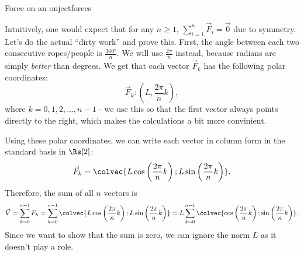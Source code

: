 \begin{example}{Force on an onject}{forces}
  \newcommand{\nrope}[2]{
    \pgfmathsetmacro{\L}{1.5}
    \pgfmathsetmacro{\n}{#1}
    \pgfmathsetmacro{\m}{\n-1}
    \pgfmathsetmacro{\degs}{int(360/\n)}
    \node[person={black}{}, minimum size=5pt] (\n-O) at (0,0) {};
    \foreach \k in {0,...,\m}{
      \node[person={#2}{}] (\n-\k) at ({\L*cos(\degs*\k)},{\L*sin(\degs*\k)}) {};
      \draw[rope] (\n-\k) -- (O);
      \draw[ropeb] (\n-\k) -- (O);
    }
    \node at (0,{\L*1.5}) {\underline{$n=\n$}};
    \draw[arcnode={-8*\L}{$\ang{\degs}$}] ({\L/2},0) arc (0:{\degs}:{\L/2});
    \draw[thick, dashed] ({\L/2},0) arc (0:{\degs}:{\L/2});
  }
  \begin{center}
    \hspace{1.5cm}

    \vspace{1em}
    \hspace{1.5cm}
  \end{center}

  Intuitively, one would expect that for any $n\geq1$, $\sum\limits_{i=1}^{n}\vec{F}_{i}=\vec{0}$ due to symmetry. Let's do the actual ``dirty work'' and prove this. First, the angle between each two consecutive ropes/people is $\frac{\ang{360}}{n}$. We will use $\frac{2\pi}{n}$ instead, because radians are simply \textit{better} than degrees. We get that each vector $\vec{F}_{k}$ has the following polar coordinates:
  \[
    \vec{F}_{k}: \left(L,\frac{2\pi}{n}k\right),
  \]
  where $k=0,1,2,\dots,n-1$ - we use this so that the first vector always points directly to the right, which makes the calculations a bit more convinient.

  Using these polar coordinates, we can write each vector in column form in the standard basis in $\Rs[2]$:
  \[
    \vec{F}_{k} = \colvec{L\cos\left(\frac{2\pi}{n}k\right);L\sin\left(\frac{2\pi}{n}k\right)}.
  \]
  Therefore, the sum of all $n$ vectors is
  \[
    \vec{V} = \sum\limits_{k=0}^{n-1}F_{k} = \sum\limits_{k=0}^{n-1}\colvec{L\cos\left(\frac{2\pi}{n}k\right);L\sin\left(\frac{2\pi}{n}k\right)} = L\sum\limits_{k=0}^{n-1}\colvec{\cos\left(\frac{2\pi}{n}k\right);\sin\left(\frac{2\pi}{n}k\right)}.
  \]
  Since we want to show that the sum is zero, we can ignore the norm $L$ as it doesn't play a role.


\end{example}
